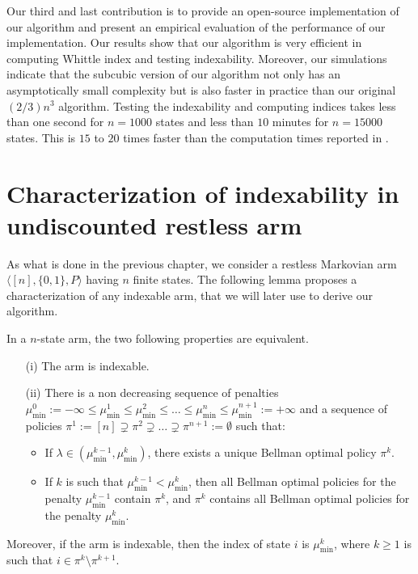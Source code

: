 Our third and last contribution is to provide an open-source implementation of our algorithm and present an empirical evaluation of the performance of our implementation. Our results show that our algorithm is very efficient in computing Whittle index and testing indexability. Moreover, our simulations indicate that the subcubic version of our algorithm not only has an asymptotically small complexity but is also faster in practice than our original $(2/3)n^3$ algorithm. Testing the indexability and computing indices takes less than one second for $n=1000$ states and less than $10$ minutes for $n=15000$ states. This is $15$ to $20$ times faster than the computation times reported in \cite{nino2020fast}.

\section{Characterization of indexability in undiscounted restless arm}

As what is done in the previous chapter, we consider a restless Markovian arm $\langle[n],\{0,1\}, P\rangle$ having $n$ finite states.
The following lemma proposes a characterization of any indexable arm, that we will later use to derive our algorithm.
\begin{lem}
    \label{ch:cpt:lem:idx}
    In a $n$-state arm, the two following properties are equivalent.
    \begin{enumerate}
        \item[(i)] The arm is indexable.
        \item[(ii)] There is a non decreasing sequence of penalties $\mu_{\min}^0:=-\infty\le\mu^1_{\min}\le\mu^2_{\min}\le\dots\le\mu^n_{\min}\le\mu^{n+1}_{\min}:=+\infty$ and a sequence of policies $\pi^1:=[n]\supsetneq\pi^2\supsetneq\dots\supsetneq\pi^{n+1}:=\emptyset$ such that:
        \begin{itemize}
            \item If $\lambda\in(\mu^{k-1}_{\min},\mu^{k}_{\min})$, there exists a unique Bellman optimal policy $\pi^{k}$.
            \item If $k$ is such that $\mu^{k-1}_{\min}<\mu^{k}_{\min}$, then all Bellman optimal policies for the penalty $\mu^{k-1}_{\min}$ contain $\pi^{k}$, and $\pi^k$ contains all Bellman optimal policies for the penalty $\mu^k_{\min}$.
        \end{itemize}
    \end{enumerate}
    Moreover, if the arm is indexable, then the index of state $i$ is $\mu^k_{\min}$, where $k\ge1$ is such that $i\in\pi^k\setminus\pi^{k+1}$.
\end{lem}

